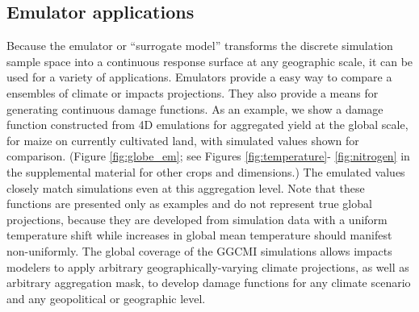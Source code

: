 \documentclass[preprint, 5p, times, twocolumn]{elsarticle}
\begin{document}
{\subsection{Emulator applications}
Because the emulator or ``surrogate model'' transforms the discrete simulation sample space into a continuous response surface at any geographic scale, it can be used for a variety of applications. Emulators provide a easy way to compare a ensembles of climate or impacts projections. They also provide a means for generating continuous damage functions. As an example, we show a damage function constructed from 4D emulations for aggregated yield at the global scale, for maize on currently cultivated land, with simulated values shown for comparison. (Figure \ref{fig:globe_em};  see Figures \ref{fig:temperature}- \ref{fig:nitrogen} in the supplemental material for other crops and dimensions.) The emulated values closely match simulations even at this aggregation level. Note that these functions are presented only as examples and do not represent true global projections, because they are developed from simulation data with a uniform temperature shift while increases in global mean temperature should manifest non-uniformly. The global coverage of the GGCMI simulations allows impacts modelers to apply arbitrary geographically-varying climate projections, as well as arbitrary aggregation mask, to develop damage functions for any climate scenario and any geopolitical or geographic level.

}
\end{document}
